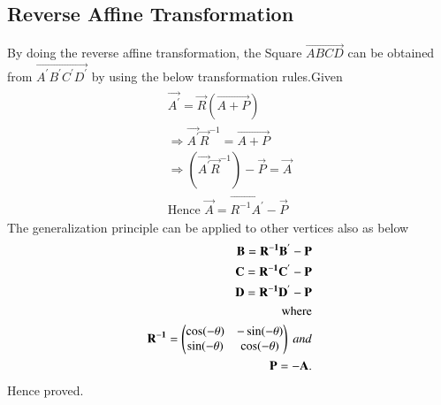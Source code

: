 \documentclass[journal,12pt,twocolumn]{IEEEtran}
\begin{document}
\subsection{Reverse Affine Transformation}
By doing the reverse affine transformation, the Square $\vec{ABCD}$ can be obtained from $\vec{A^{'}B^{'}C^{'}D^{'}}$ by using the below transformation rules.Given\\
\begin{align}
\begin{split}
\vec{A^{'}} = \vec{R}(\vec{A+P})\\
\Rightarrow \vec{A^{'}}\vec{R}^{-1} = \vec{A+P}\\
\Rightarrow (\vec{A^{'}}\vec{R}^{-1})-\vec{P} = \vec{A}\\
\text{Hence }
\vec{A} = \vec{R^{-1}A^{'}}-\vec{P}
\end{split}
\end{align}
The generalization principle can be applied to other vertices also as below\\
\begin{align}
\begin{split}
\mathbf{B} = \mathbf{R^{-1}B^{'}}-\mathbf{P}\\
\mathbf{C} = \mathbf{R^{-1}C^{'}}-\mathbf{P}\\
\mathbf{D} = \mathbf{R^{-1}D^{'}}-\mathbf{P}\\
\text{where}\\
\mathbf{R^{-1}} = \begin{pmatrix}\cos (-\theta)& -\sin (-\theta)\\\sin (-\theta) & \cos (-\theta)\end{pmatrix} \ and\\
\mathbf{P} =  - \mathbf{A}.
\end{split}
\end{align}
Hence proved.
\end{document}
